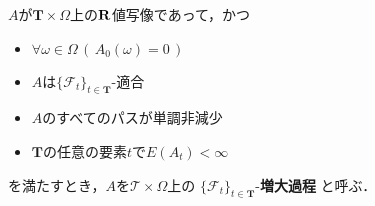	\begin{screen}
		\begin{dfn}[増大過程]
			$A$が$\mathbf{T} \times \Omega$上の$\mathbf{R}$値写像であって，かつ
			\begin{itemize}
				\item $\forall \omega \in \Omega\, (\, A_0(\omega) = 0\, )$
				\item $A$は$\{\mathscr{F}_t\}_{t \in \mathbf{T}}$-適合
				\item $A$のすべてのパスが単調非減少
				\item $\mathbf{T}$の任意の要素$t$で$E(A_t) < \infty$
			\end{itemize}
			を満たすとき，$A$を$\mathscr{T} \times \Omega$上の
			$\{\mathscr{F}_t\}_{t \in \mathbf{T}}$-{\bf 増大過程}
			と呼ぶ．
		\end{dfn}
	\end{screen}
	
	\begin{comment}
	\begin{screen}
		\begin{dfn}[ナチュラル]
			$A$を$(\Omega,\mathscr{F},P)$上の$\{\mathscr{F}_t\}_{t \in \mathbf{T}}$-増大過程とする．
			$M$を任意に与えられた$(\Omega,\mathscr{F},P)$上の有界かつ$RCLL$な
			$\{\mathscr{F}_t\}_{t \in \mathbf{T}}$-マルチンゲールとするとき
			\begin{align}
				\forall t \in \mathbf{T}\, 
				\left[\, E(M_t A_t) = E \int_{(0,t]} M_{s-}\ dA_s\, \right]
			\end{align}
			が成り立つならば，$A$は{\bf ナチュラル}\index{ナチュラル}{\bf (natural)}であるという．
			$(\Omega,\mathscr{F},P)$上のナチュラル過程の全体を
			\begin{align}
				\mathscr{N}_{\mathbf{T}}
			\end{align}
			で表し，区別不能性で類別した商集合を
			\begin{align}
				\mathfrak{N}_{\mathbf{T}}
			\end{align}
			で表す．同様に，$(\Omega,\mathscr{F},P)$上の連続なナチュラル過程の全体を
			\begin{align}
				\mathscr{N}^c_{\mathbf{T}}
			\end{align}
			で表し，区別不能性で類別した商集合を
			\begin{align}
				\mathfrak{N}^c_{\mathbf{T}}
			\end{align}
			で表す．
		\end{dfn}
	\end{screen}
	
	\end{comment}
	
